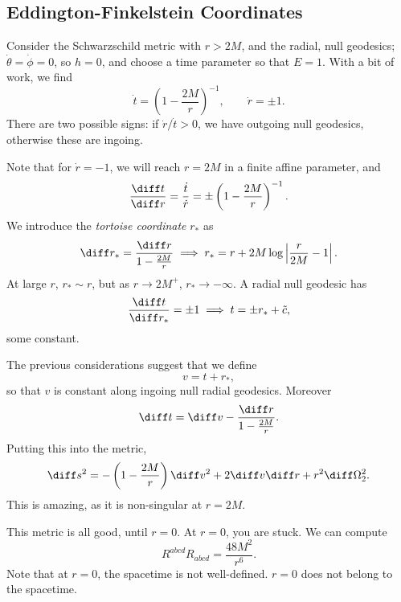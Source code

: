 \documentclass[12pt]{article}
\begin{document}
\subsection{Eddington-Finkelstein Coordinates}%
\label{sub:efc}

Consider the Schwarzschild metric with $r > 2M$, and the radial, null geodesics; $\dot \theta = \dot \phi = 0$, so $h = 0$, and choose a time parameter so that $E = 1$. With a bit of work, we find
\[
\dot t = \left( 1 - \frac{2M}{r} \right)^{-1}, \qquad \dot r = \pm 1.
\]
There are two possible signs: if $\dot r/ \dot t > 0$, we have outgoing null geodesics, otherwise these are ingoing.

Note that for $\dot r = -1$, we will reach $r = 2M$ in a finite affine parameter, and
\[
\frac{\diff t}{\diff r} = \frac{\dot t}{\dot r} = \pm \left(1 - \frac{2M}{r} \right)^{-1}.
\]
We introduce the \emph{tortoise coordinate} $r_\ast$ as
\[
\diff r_\ast = \frac{\diff r}{1 - \frac{2M}{r}} \implies r_\ast = r + 2M \log \left| \frac{r}{2M} - 1 \right|.
\]
At large $r$, $r_\ast \sim r$, but as $r \to 2M^{+}$, $r_\ast \to -\infty$. A radial null geodesic has
\[
\frac{\diff t}{\diff r_\ast} = \pm 1 \implies t = \pm r_\ast + \tilde c,
\]
some constant.

The previous considerations suggest that we define
\[
v = t + r_\ast,
\]
so that $v$ is constant along ingoing null radial geodesics. Moreover
\[
\diff t = \diff v - \frac{\diff r}{1 - \frac{2M}{r}}.
\]
Putting this into the metric,
\[
\diff s^2 = - \left(1 - \frac{2M}{r} \right) \diff v^2 + 2 \diff v \diff r + r^2 \diff \Omega_2^2.
\]
This is amazing, as it is non-singular at $r = 2M$.

This metric is all good, until $r = 0$. At $r = 0$, you are stuck. We can compute
\[
R^{abcd} R_{abcd} = \frac{48 M^2}{r^6}.
\]
Note that at $r = 0$, the spacetime is not well-defined. $r = 0$ does not belong to the spacetime.


\newpage

\printindex
\end{document}
